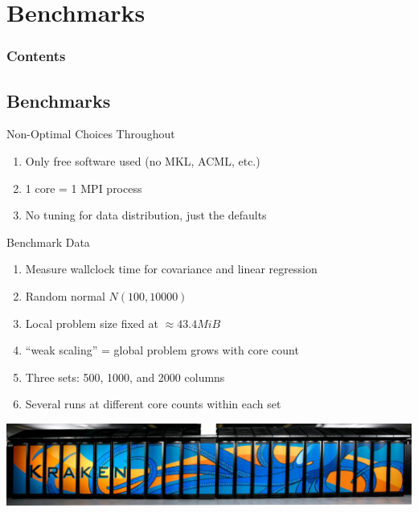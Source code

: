 \section{Benchmarks}

\hidenum
\begin{frame}[noframenumbering]
\frametitle{Contents}
\end{frame}
\shownum



\subsection{Benchmarks}

\begin{frame}
  \begin{block}{Non-Optimal Choices Throughout}
    \begin{enumerate}[<+-|alert@+>]
      \item Only free software used (no MKL, ACML, etc.)
      \item 1 core = 1 MPI process
      \item No tuning for data distribution, just the defaults
    \end{enumerate}
  \end{block}
\end{frame}

\begin{frame}
  \begin{block}{Benchmark Data}
    \begin{enumerate}[<+-|alert@+>]
      \item Measure wallclock time for covariance and linear regression
      \item Random normal $N(100, 10000)$
      \item Local problem size fixed at $\approx 43.4 MiB$
      \item ``weak scaling'' = global problem grows with core count
      \item Three sets:  500, 1000, and 2000 columns
      \item Several runs at different core counts within each set
    \end{enumerate}
    \vspace{.8cm}
    \centering\includegraphics{../common/pics/krakenWide}
  \end{block}
\end{frame}

